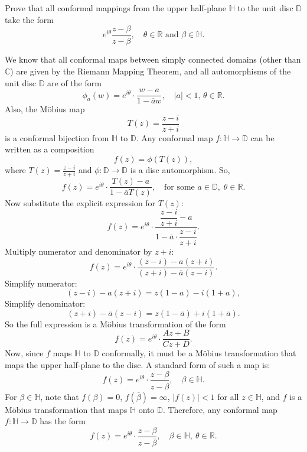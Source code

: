 \documentclass[12pt]{article}
\begin{document}
\begin{statement}[8.5.13]
\end{statement}

\begin{statement}[8.5.14]
    Prove that all conformal mappings from the upper half-plane $\mathbb{H}$ to the unit disc $\mathbb{D}$ take the form
    $$ e^{i\theta} \frac{z - \beta}{z - \overline{\beta}}, \quad \theta \in \mathbb{R} \text{ and } \beta \in \mathbb{H}. $$
\end{statement}
\begin{newproof}
    We know that all conformal maps between simply connected domains (other than $\mathbb{C}$) are given by the Riemann Mapping Theorem, and all automorphisms of the unit disc $\mathbb{D}$ are of the form
    $$ \phi_a(w) = e^{i\theta} \cdot \frac{w - a}{1 - \overline{a}w}, \quad |a| < 1,\, \theta \in \mathbb{R}. $$
    Also, the Möbius map 
    $$ T(z) = \frac{z - i}{z + i} $$
    is a conformal bijection from $\mathbb{H}$ to $\mathbb{D}$. Any conformal map $f : \mathbb{H} \to \mathbb{D}$ can be written as a composition
    $$ f(z) = \phi(T(z)), $$
    where $T(z) = \frac{z - i}{z + i}$ and $\phi : \mathbb{D} \to \mathbb{D}$ is a disc automorphism. So,
    $$ f(z) = e^{i\theta} \cdot \frac{T(z) - a}{1 - \overline{a} T(z)}, \quad \text{for some } a \in \mathbb{D},\; \theta \in \mathbb{R}. $$
    Now substitute the explicit expression for $T(z)$:
    $$ f(z) = e^{i\theta} \cdot \frac{\dfrac{z - i}{z + i} - a}{1 - \overline{a} \cdot \dfrac{z - i}{z + i}}. $$
    Multiply numerator and denominator by $z + i$: 
    $$ f(z) = e^{i\theta} \cdot \frac{(z - i) - a(z + i)}{(z + i) - \overline{a}(z - i)}. $$
    Simplify numerator:
    $$ (z - i) - a(z + i) = z(1 - a) - i(1 + a), $$
    Simplify denominator:
    $$ (z + i) - \overline{a}(z - i) = z(1 - \overline{a}) + i(1 + \overline{a}). $$
    So the full expression is a Möbius transformation of the form 
    $$ f(z) = e^{i\theta} \cdot \frac{A z + B}{C z + D}. $$
    Now, since $f$ maps $\mathbb{H}$ to $\mathbb{D}$ conformally, it must be a Möbius transformation that maps the upper half-plane to the disc. A standard form of such a map is:
    $$ f(z) = e^{i\theta} \cdot \frac{z - \beta}{z - \overline{\beta}}, \quad \beta \in \mathbb{H}. $$
    For $\beta \in \mathbb{H}$, note that $f(\beta) = 0$, $f(\overline{\beta}) = \infty$, $|f(z)| < 1$ for all $z \in \mathbb{H}$, and $f$ is a Möbius transformation that maps $\mathbb{H}$ onto $\mathbb{D}$.
    Therefore, any conformal map $f : \mathbb{H} \to \mathbb{D}$ has the form 
    $$ f(z) = e^{i\theta} \cdot \frac{z - \beta}{z - \overline{\beta}}, \quad \beta \in \mathbb{H},\ \theta \in \mathbb{R}.$$
\end{newproof}
\end{document}
